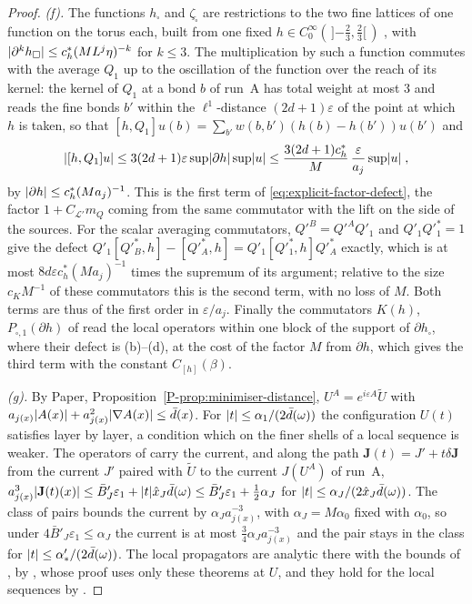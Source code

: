 \documentclass[11pt]{preprint}
\DeclarePairedDelimiter{\abs}{\lvert}{\rvert}
\numberwithin{equation}{section}
\theoremstyle{definition}
\theoremstyle{remark}
\theoremstyle{plain}
\begin{document}
\begin{proof}
\emph{(f).} The functions $h_\square$ and $\zeta_{\tilde\square}$ are restrictions to the two fine lattices of one function on the torus each, built from one fixed $h \in C^\infty_0(\,]{-\frac23}, \frac23[\,)$ \cite[(1.118), p.~36]{BalabanPRT1} \cite[p.~229]{BalabanPRT2} \cite[pp.~408, 414]{BalabanPBG}, with $\abs{\partial^kh_\square} \leq c^*_h(ML^j\eta)^{-k}$ for $k \leq 3$. The multiplication by such a function commutes with the average $Q_1$ up to the oscillation of the function over the reach of its kernel: the kernel of $Q_1$ at a bond $b$ of run~A has total weight at most $3$ and reads the fine bonds $b'$ within the $\ell^1$-distance $(2d + 1)\varepsilon$ of the point at which $h$ is taken, so that $[h, Q_1]u(b) = \sum_{b'}w(b, b')(h(b) - h(b'))u(b')$ and
\[
    \abs{[h, Q_1]u} \leq 3(2d + 1)\varepsilon\sup\abs{\partial h}\sup\abs u \leq \frac{3(2d + 1)c^*_h}{M}\,\frac{\varepsilon}{a_j}\sup\abs u\;,
\]
by $\abs{\partial h} \leq c^*_h(Ma_j)^{-1}$. This is the first term of \eqref{eq:explicit-factor-defect}, the factor $1 + C_{\mathcal L'}m_Q$ coming from the same commutator with the lift on the side of the sources. For the scalar averaging commutators, $Q'^B = Q'^AQ'_1$ and $Q'_1Q'^*_1 = 1$ give the defect $Q'_1[Q'^*_B, h] - [Q'^*_A, h] = Q'_1[Q'^*_1, h]Q'^*_A$ exactly, which is at most $8d\varepsilon c^*_h(Ma_j)^{-1}$ times the supremum of its argument; relative to the size $c_KM^{-1}$ of these commutators this is the second term, with no loss of $M$. Both terms are thus of the first order in $\varepsilon/a_j$. Finally the commutators $K(h)$, $P_{\square,1}(\partial h)$ of \cite[(3.88), (3.101)--(3.105), pp.~409, 414]{BalabanPBG} read the local operators within one block of the support of $\partial h_\square$, where their defect is (b)--(d), at the cost of the factor $M$ from $\partial h$, which gives the third term with the constant $C_{[h]}(\beta)$.

\emph{(g).} By Paper, Proposition~\ref{P-prop:minimiser-distance}, $U^A = e^{i\varepsilon A}\tilde U$ with $a_{j(x)}\abs{A(x)} + a_{j(x)}^2\abs{\nabla A(x)} \leq \bar d(x)$. For $\abs t \leq \alpha_1/(2\bar d(\omega))$ the configuration $U(t)$ satisfies \cite[(3.37)]{BalabanPBG} layer by layer, a condition which on the finer shells of a local sequence is weaker. The operators of \cite[Sect.~D]{BalabanPBG} carry the current, and along the path $\mathbf J(t) = J' + t\delta\mathbf J$ from the current $J'$ paired with $\tilde U$ to the current $J(U^A)$ of run~A, $a_{j(x)}^3\abs{\mathbf J(t)(x)} \leq \bar B'_J\varepsilon_1 + \abs t\hat x_J\bar d(\omega) \leq \bar B'_J\varepsilon_1 + \frac12\alpha_J$ for $\abs t \leq \alpha_J/(2\hat x_J\bar d(\omega))$. The class of pairs bounds the current by $\alpha_Ja_{j(x)}^{-3}$, with $\alpha_J = M\alpha_0$ fixed with $\alpha_0$, so under $4\bar B'_J\varepsilon_1 \leq \alpha_J$ the current is at most $\frac34\alpha_Ja_{j(x)}^{-3}$ and the pair stays in the class for $\abs t \leq \alpha'_*/(2\bar d(\omega))$. The local propagators are analytic there with the bounds of \cite[Theorems~3.1--3.3]{BalabanPBG}, by \cite[Theorem~3.4, p.~400]{BalabanPBG}, whose proof uses only these theorems at $U$, and they hold for the local sequences by \cite[Corollary~3.6, p.~408]{BalabanPBG}.


\end{proof}
\end{document}
